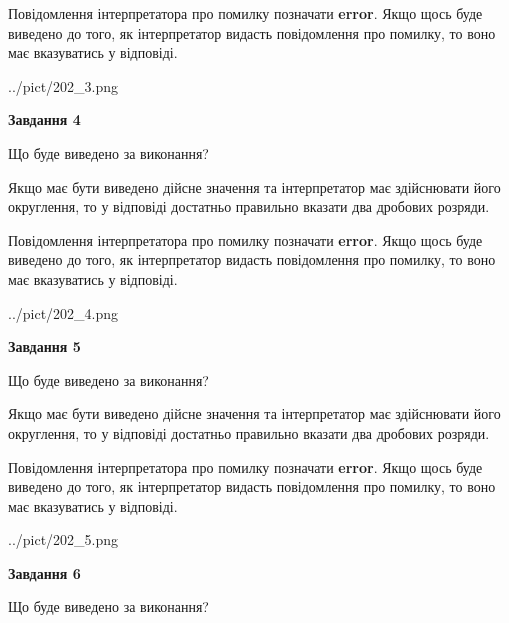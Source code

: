 \documentclass[12pt, ukrainian]{article}
\begin{document}
{\begin {Large}
Повідомлення інтерпретатора про помилку позначати \textbf{error}.
Якщо щось буде виведено до того, як інтерпретатор видасть повідомлення про помилку, 
то воно має вказуватись у відповіді. \par

\begin{center}
	{../pict/202_3.png}
\end{center}
\newpage

{\begin {center}\textbf{Завдання 4}\end {center}}\par
Що буде виведено за виконання? \par

Якщо має бути виведено дійсне значення та інтерпретатор має здійснювати його округлення, 
то у відповіді достатньо правильно вказати два дробових розряди.

Повідомлення інтерпретатора про помилку позначати \textbf{error}.
Якщо щось буде виведено до того, як інтерпретатор видасть повідомлення про помилку, 
то воно має вказуватись у відповіді. \par

\begin{center}
	{../pict/202_4.png}
\end{center}
\newpage

{\begin {center}\textbf{Завдання 5}\end {center}}\par
Що буде виведено за виконання? \par

Якщо має бути виведено дійсне значення та інтерпретатор має здійснювати його округлення, 
то у відповіді достатньо правильно вказати два дробових розряди.

Повідомлення інтерпретатора про помилку позначати \textbf{error}.
Якщо щось буде виведено до того, як інтерпретатор видасть повідомлення про помилку, 
то воно має вказуватись у відповіді. \par

\begin{center}
	{../pict/202_5.png}
\end{center}
\newpage

{\begin {center}\textbf{Завдання 6}\end {center}}\par
Що буде виведено за виконання? \par


\end{Large}}
\end{document}
